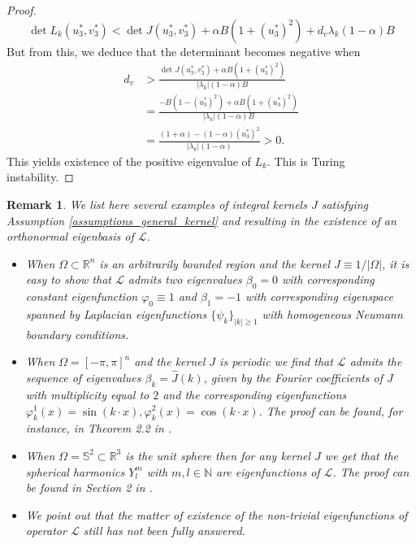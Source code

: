 \documentclass[12pt, a4paper]{article}
\theoremstyle{break}
\theoremstyle{break}
\theoremstyle{break}
\theoremstyle{break}
\newtheorem{rem}{Remark}[section]
\theoremstyle{break}
\theoremstyle{break}
\theoremstyle{break}
\begin{document}
\begin{proof}
\begin{equation*}
        \det L_k(u_3^*, v_3^*) < \det J(u_3^*, v_3^*) + \alpha B (1 + (u_3^*)^2) + d_v \lambda_k (1 - \alpha) B
    \end{equation*}
    But from this, we deduce that the determinant becomes negative when
    \begin{align*}
        d_v 
        &> \frac{\det J(u_3^*, v_3^*) + \alpha B (1 + (u_3^*)^2)}{|\lambda_k| (1-\alpha) B} \\
        &= \frac{-B(1-(u_3^*)^2) + \alpha B (1 + (u_3^*)^2)}{|\lambda_k|(1-\alpha) B} \\
        &= \frac{(1 + \alpha) - (1 - \alpha) (u_3^*)^2}{|\lambda_k|(1 - \alpha)} > 0.
    \end{align*}
    This yields existence of the positive eigenvalue of $L_k$. This is Turing instability.
\end{proof}
\begin{rem}
    We list here several examples of integral kernels $J$ satisfying Assumption \ref{assumptions_general_kernel} and resulting in the existence of an orthonormal eigenbasis of $\mathcal{L}$.
    \begin{itemize}
        \item When $\Omega \subset \mathbb{R}^n$ is an arbitrarily bounded region and the kernel $J \equiv 1 / |\Omega|$, it is easy to show that $\mathcal{L}$ admits two eigenvalues $\beta_0 = 0$ with corresponding constant eigenfunction $\varphi_0 \equiv 1$ and $\beta_1 = -1$ with corresponding eigenspace spanned by Laplacian eigenfunctions $\{\psi_k\}_{|k| \geq 1}$ with homogeneous Neumann boundary conditions.
        \item When $\Omega = [-\pi, \pi]^n$ and the kernel $J$ is periodic we find that $\mathcal{L}$ admits the sequence of eigenvalues $\beta_k = \hat{J}(k)$, given by the Fourier coefficients of $J$ with multiplicity equal to $2$ and the corresponding eigenfunctions $\varphi_k^1(x) = \sin(k\cdot x), \varphi_k^2(x) = \cos(k\cdot x)$. The proof can be found, for instance, in Theorem 2.2 in \cite{Tadej2025}.
        \item When $\Omega = \mathbb{S}^2 \subset \mathbb{R}^3$ is the unit sphere then for any kernel $J$ we get that the spherical harmonics $Y^m_l$ with $m, l \in \mathbb{N}$ are eigenfunctions of $\mathcal{L}$. The proof can be found in Section 2 in \cite{SlevinskyMontanelliDu2018}.
        \item We point out that the matter of existence of the non-trivial eigenfunctions of operator $\mathcal{L}$ still has not been fully answered.
    \end{itemize}
\end{rem}
\end{document}
